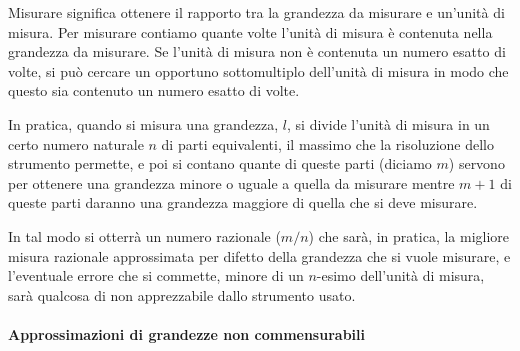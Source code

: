Misurare significa ottenere il rapporto tra la grandezza da misurare e 
un'unità di misura.
Per misurare contiamo quante volte l'unità di misura è contenuta nella 
grandezza da misurare.
Se l'unità di misura non è contenuta un numero esatto di volte, si può 
cercare un opportuno sottomultiplo dell'unità di misura in modo che questo 
sia contenuto un numero esatto di volte. 

In pratica, quando si misura una grandezza, \(l\), si divide l'unità di 
misura in un certo numero naturale \(n\) di parti equivalenti, il massimo che 
la risoluzione dello strumento permette,
e poi si contano quante di queste parti (diciamo \(m\)) servono per ottenere 
una grandezza minore o uguale a quella da misurare mentre \(m+1\) di queste 
parti daranno una grandezza maggiore di quella che si deve misurare.


In tal modo si otterrà un numero razionale (\(m/n\)) che sarà, in pratica, 
la migliore misura razionale approssimata per difetto della grandezza che si 
vuole misurare, e l'eventuale errore che si commette, minore di un 
\(n\)-esimo dell'unità di misura, sarà qualcosa di non apprezzabile dallo 
strumento usato.

\vspace{.4em}

\paragraph{Approssimazioni di grandezze non commensurabili}

